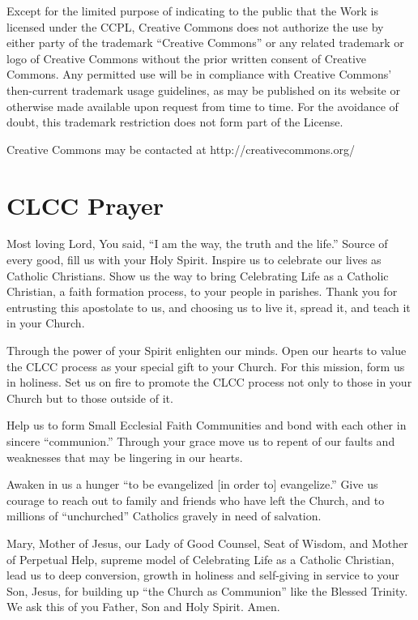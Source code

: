 \documentclass[oneside]{book}
\begin{document}
Except for the limited purpose of indicating to the public that the Work is
licensed under the CCPL, Creative Commons does not authorize the use by either
party of the trademark ``Creative Commons'' or any related trademark or logo of
Creative Commons without the prior written consent of Creative Commons. Any
permitted use will be in compliance with Creative Commons' then-current
trademark usage guidelines, as may be published on its website or otherwise made
available upon request from time to time. For the avoidance of doubt, this
trademark restriction does not form part of the License.

Creative Commons may be contacted at
  http://creativecommons.org/


\chapter{CLCC Prayer}

Most loving Lord,
You said, ``I am the way, the truth and the life.''
Source of every good, fill us with your Holy Spirit.
Inspire us to celebrate our lives as Catholic Christians.
Show us the way to bring Celebrating Life as a
Catholic Christian, a faith formation process, to
your people in parishes. Thank you for entrusting
this apostolate to us, and choosing us to live it,
spread it, and teach it in your Church.

Through the power of your Spirit enlighten our minds.
Open our hearts to value the CLCC process as your
special gift to your Church. For this mission, form us
in holiness. Set us on fire to promote the CLCC process
not only to those in your Church but to those outside of it.

Help us to form Small Ecclesial Faith Communities and
bond with each other in sincere ``communion.''
Through your grace move us to repent of our faults
and weaknesses that may be lingering in our hearts.

Awaken in us a hunger ``to be evangelized [in order to]
evangelize.'' Give us courage to reach out to family
and friends who have left the Church, and to millions
of ``unchurched'' Catholics gravely in need of salvation.

Mary, Mother of Jesus, our Lady of Good Counsel, Seat
of Wisdom, and Mother of Perpetual Help, supreme
model of Celebrating Life as a Catholic Christian, lead us
to deep conversion, growth in holiness and self-giving in
service to your Son, Jesus, for building up ``the Church
as Communion'' like the Blessed Trinity. We ask this of
you Father, Son and Holy Spirit. Amen.
\end{document}
